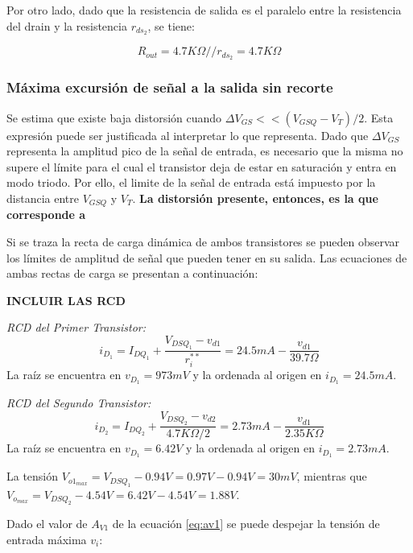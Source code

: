 \documentclass[a4paper, 10pt, spanish]{article}
\begin{document}
Por otro lado, dado que la resistencia de salida es el paralelo entre la resistencia del drain y la resistencia $r_{ds_2}$, se tiene:

\begin{equation}
  R_{out}=4.7K\Omega // r_{ds_2} = 4.7K\Omega
\end{equation}

\subsubsection{Máxima excursión de señal a la salida sin recorte}

Se estima que existe baja distorsión cuando $\Delta V_{GS} << (V_{GSQ}-V_T)/2$. Esta expresión puede ser justificada al interpretar lo que representa. Dado que $\Delta V_{GS}$ representa la amplitud pico de la señal de entrada, es necesario que la misma no supere el límite para el cual el transistor deja de estar en saturación y entra en modo triodo. Por ello, el limite de la señal de entrada está impuesto por la distancia entre $V_{GSQ}$ y $V_T$. \textbf{La distorsión presente, entonces, es la que corresponde a}

Si se traza la recta de carga dinámica de ambos transistores se pueden observar los límites de amplitud de señal que pueden tener en su salida. Las ecuaciones de ambas rectas de carga se presentan a continuación:


\textbf{INCLUIR LAS RCD}

\textit{RCD del Primer Transistor:}
\begin{equation}
  i_{D_1} = I_{DQ_1} + \frac{V_{DSQ_1} - v_{d1}}{r_i^{**}} = 24.5mA - \frac{v_{d1}}{39.7\Omega}
\end{equation}
La raíz se encuentra en $v_{D_1} = 973mV$ y la ordenada al origen en $i_{D_1} = 24.5mA$.

\textit{RCD del Segundo Transistor:}
\begin{equation}
  i_{D_2} = I_{DQ_2} + \frac{V_{DSQ_2} - v_{d2}}{4.7K\Omega/2} = 2.73mA - \frac{v_{d1}}{2.35K\Omega}
\end{equation}
La raíz se encuentra en $v_{D_1} = 6.42V$ y la ordenada al origen en $i_{D_1} = 2.73mA$.

La tensión $V_{o1_{max}}= V_{DSQ_1} - 0.94V = 0.97V - 0.94V = 30mV$, mientras que $V_{o_{max}}= V_{DSQ_2} - 4.54V = 6.42V - 4.54V = 1.88V$.

Dado el valor de $A_{V1}$ de la ecuación \ref{eq:av1} se puede despejar la tensión de entrada máxima $v_i$:
\end{document}
